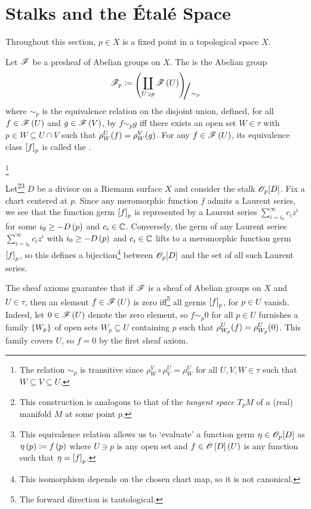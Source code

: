 \documentclass[../Moduli_Spaces_of_Riemann_Surfaces.tex]{subfiles}
\begin{document}
    \section{Stalks and the Étalé Space}
    Throughout this section, $p\in X$ is a fixed point in a topological space $X$.
    \begin{definition}\label{CS:def:stalk}
        Let $\mathscr{F}$ be a presheaf of Abelian groups on $X$. The  is the Abelian group
        \begin{equation*}
            \ms{F}_p\coloneqq\raisebox{-2pt}{$\Biggl(\!$}\coprod_{U\ni p}\ms{F}\l(U\r)\!\raisebox{-2pt}{$\Biggr)$}\!\!_{\scalebox{2}{/}\sim_p}
        \end{equation*}
        where $\sim_p$ is the equivalence relation on the disjoint union, defined, for all $f\in\mathscr{F}\left(U\right)$ and $g\in\mathscr{F}\left(V\right)$, by $f\sim_p g$ iff there exists an open set $W\in\tau$ with $p\in W\subseteq U\cap V$ such that $\rho^U_W\!\left(f\right)=\rho^V_W\!\left(g\right)$. For any $f\in\mathscr{F}\left(U\right)$, its equivalence class $\left[f\right]_p$ is called the .
    \end{definition}
    \footnote{The relation $\sim_p$ is transitive since $\rho^V_W\circ\rho^U_V=\rho^U_W$ for all $U,V,W\in\tau$ such that $W\subseteq V\subseteq U$.}
    \vspace{-0.05in}
    \begin{example}
        Let\footnote{This construction is analogous to that of the \textit{tangent space} $T_pM$ of a (real) manifold $M$ at some point $p$.}\footnote{This equivalence relation allows us to `evaluate' a function germ $\eta\in\mathscr{O}_p\!\left[D\right]$ as $\eta\left(p\right)\coloneqq f\left(p\right)$ where $U\ni p$ is any open set and $f\in\mathscr{O}\left[D\right]\left(U\right)$ is any function such that $\eta=\left[f\right]_p$.} $D$ be a divisor on a Riemann surface $X$ and consider the stalk $\mathscr{O}_p\!\left[D\right]$. Fix a chart centered at $p$. Since any meromorphic function $f$ admits a Laurent series, we see that the function germ $\left[f\right]_p$ is represented by a Laurent series $\sum_{i=i_0}^{\infty}c_iz^i$ for some $i_0\geq-D\left(p\right)$ and $c_i\in\mathbb{C}$. Conversely, the germ of any Laurent series $\sum_{i=i_0}^{\infty}c_iz^i$ with $i_0\geq-D\left(p\right)$ and $c_i\in\mathbb{C}$ lifts to a meromorphic function germ $\left[f\right]_p$, so this defines a bijection\footnote{This isomorphism depends on the chosen chart map, so it is not canonical.} between $\mathscr{O}_p\!\left[D\right]$ and the set of all such Laurent series.\exqed
    \end{example}
    \begin{remark}
        The sheaf axioms guarantee that if $\mathscr{F}$ is a sheaf of Abelian groups on $X$ and $U\in\tau$, then an element $f\in\mathscr{F}\left(U\right)$ is zero iff\footnote{The forward direction is tautological.} all germs $\left[f\right]_p$, for $p\in U$ vanish. Indeed, let $0\in\mathscr{F}\left(U\right)$ denote the zero element, so $f\sim_p0$ for all $p\in U$ furnishes a family $\left\{W_p\right\}$ of open sets $W_p\subseteq U$ containing $p$ such that $\rho^U_{W_p}\!\left(f\right)=\rho^U_{W_p}\!\left(0\right)$. This family covers $U$, so $f=0$ by the first sheaf axiom.\exqed
    \end{remark}
\end{document}
